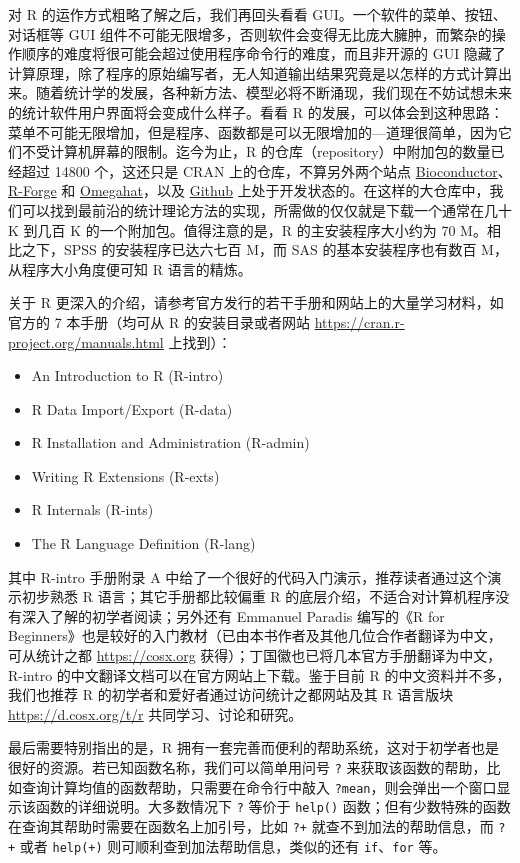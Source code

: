 \documentclass[
  b5paper,
  UTF8,twoside]{book}
\providecommand{\tightlist}{%
  \setlength{\itemsep}{0pt}\setlength{\parskip}{0pt}}
\begin{document}
对 R 的运作方式粗略了解之后，我们再回头看看 GUI。一个软件的菜单、按钮、对话框等 GUI 组件不可能无限增多，否则软件会变得无比庞大臃肿，而繁杂的操作顺序的难度将很可能会超过使用程序命令行的难度，而且非开源的 GUI 隐藏了计算原理，除了程序的原始编写者，无人知道输出结果究竟是以怎样的方式计算出来。随着统计学的发展，各种新方法、模型必将不断涌现，我们现在不妨试想未来的统计软件用户界面将会变成什么样子。看看 R 的发展，可以体会到这种思路：菜单不可能无限增加，但是程序、函数都是可以无限增加的---道理很简单，因为它们不受计算机屏幕的限制。迄今为止，R 的仓库（repository）中附加包的数量已经超过 14800 个，这还只是 CRAN 上的仓库，不算另外两个站点 \href{https://www.bioconductor.org/}{Bioconductor}、 \href{https://r-forge.r-project.org/}{R-Forge} 和 \href{http://www.omegahat.net/}{Omegahat}，以及 \href{https://github.com}{Github} 上处于开发状态的。在这样的大仓库中，我们可以找到最前沿的统计理论方法的实现，所需做的仅仅就是下载一个通常在几十 K 到几百 K 的一个附加包。值得注意的是，R 的主安装程序大小约为 70 M。相比之下，SPSS 的安装程序已达六七百 M，而 SAS 的基本安装程序也有数百 M，从程序大小角度便可知 R 语言的精炼。

关于 R 更深入的介绍，请参考官方发行的若干手册和网站上的大量学习材料，如官方的 7 本手册（均可从 R 的安装目录或者网站 \url{https://cran.r-project.org/manuals.html} 上找到）：

\begin{itemize}
\tightlist
\item
  An Introduction to R (R-intro)
\item
  R Data Import/Export (R-data)
\item
  R Installation and Administration (R-admin)
\item
  Writing R Extensions (R-exts)
\item
  R Internals (R-ints)
\item
  The R Language Definition (R-lang)
\end{itemize}

其中 R-intro 手册附录 A 中给了一个很好的代码入门演示，推荐读者通过这个演示初步熟悉 R 语言；其它手册都比较偏重 R 的底层介绍，不适合对计算机程序没有深入了解的初学者阅读；另外还有 Emmanuel Paradis 编写的《R for Beginners》也是较好的入门教材（已由本书作者及其他几位合作者翻译为中文，可从统计之都 \url{https://cosx.org} 获得）；丁国徽也已将几本官方手册翻译为中文，R-intro 的中文翻译文档可以在官方网站上下载。鉴于目前 R 的中文资料并不多，我们也推荐 R 的初学者和爱好者通过访问统计之都网站及其 R 语言版块 \url{https://d.cosx.org/t/r} 共同学习、讨论和研究。

最后需要特别指出的是，R 拥有一套完善而便利的帮助系统，这对于初学者也是很好的资源。若已知函数名称，我们可以简单用问号 \texttt{?} 来获取该函数的帮助，比如查询计算均值的函数帮助，只需要在命令行中敲入 \texttt{?mean}，则会弹出一个窗口显示该函数的详细说明。大多数情况下 \texttt{?} 等价于 \texttt{help()} 函数；但有少数特殊的函数在查询其帮助时需要在函数名上加引号，比如 \texttt{?+} 就查不到加法的帮助信息，而 \texttt{?\textquotesingle{}+\textquotesingle{}} 或者 \texttt{help(\textquotesingle{}+\textquotesingle{})} 则可顺利查到加法帮助信息，类似的还有 \texttt{if}、\texttt{for} 等。
\end{document}
